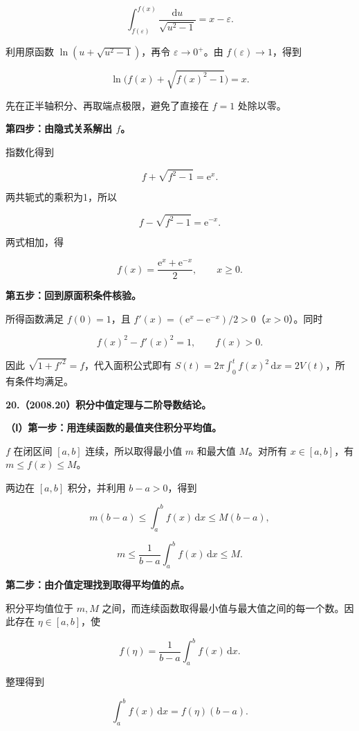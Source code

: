 \documentclass[UTF8,11pt,fontset=windows]{ctexart}
\begin{document}
$$
\int_{f(\varepsilon)}^{f(x)}\frac{\mathrm du}{\sqrt{u^2-1}}
=x-\varepsilon.
$$

利用原函数 $\ln(u+\sqrt{u^2-1})$，再令 $\varepsilon\to0^+$。由 $f(\varepsilon)\to1$，得到

$$
\ln\bigl(f(x)+\sqrt{f(x)^2-1}\bigr)=x.
$$

先在正半轴积分、再取端点极限，避免了直接在 $f=1$ 处除以零。

\textbf{第四步：由隐式关系解出 $f$。}

指数化得到

$$
f+\sqrt{f^2-1}=\mathrm e^x.
$$

两共轭式的乘积为1，所以

$$
f-\sqrt{f^2-1}=\mathrm e^{-x}.
$$

两式相加，得

$$
\boxed{f(x)=\frac{\mathrm e^x+\mathrm e^{-x}}2,\qquad x\ge0}.
$$

\textbf{第五步：回到原面积条件核验。}

所得函数满足 $f(0)=1$，且 $f'(x)=(\mathrm e^x-\mathrm e^{-x})/2>0$（$x>0$）。同时

$$
f(x)^2-f'(x)^2=1,
\qquad f(x)>0.
$$

因此 $\sqrt{1+f'^2}=f$，代入面积公式即有 $S(t)=2\pi\int_0^t f(x)^2\,\mathrm dx=2V(t)$，所有条件均满足。

\clearpage

\textbf{20.（2008.20）积分中值定理与二阶导数结论。}

\textbf{（Ⅰ）第一步：用连续函数的最值夹住积分平均值。}

$f$ 在闭区间 $[a,b]$ 连续，所以取得最小值 $m$ 和最大值 $M$。对所有 $x\in[a,b]$，有 $m\le f(x)\le M$。

两边在 $[a,b]$ 积分，并利用 $b-a>0$，得到

$$
m(b-a)\le\int_a^b f(x)\,\mathrm dx\le M(b-a),
$$

$$
m\le\frac1{b-a}\int_a^b f(x)\,\mathrm dx\le M.
$$

\textbf{第二步：由介值定理找到取得平均值的点。}

积分平均值位于 $m,M$ 之间，而连续函数取得最小值与最大值之间的每一个数。因此存在 $\eta\in[a,b]$，使

$$
f(\eta)=\frac1{b-a}\int_a^b f(x)\,\mathrm dx.
$$

整理得到

$$
\boxed{\int_a^b f(x)\,\mathrm dx=f(\eta)(b-a)}.
$$
\end{document}
